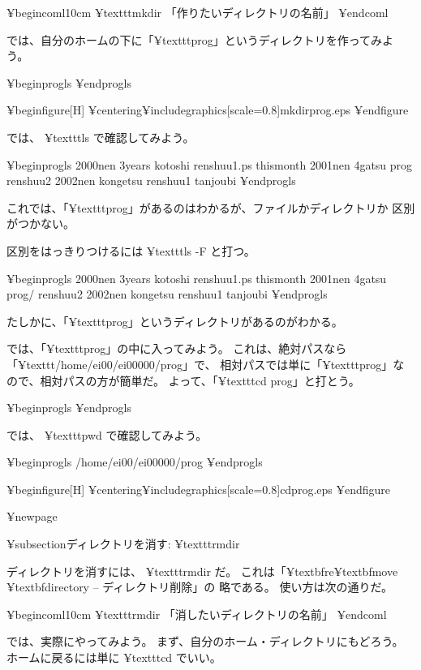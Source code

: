 {¥begin{coml}{10cm}
¥texttt{mkdir} 「作りたいディレクトリの名前」
¥end{coml}

では、自分のホームの下に「¥texttt{prog}」というディレクトリを作ってみよう。

¥begin{progls}
%
¥end{progls}

¥begin{figure}[H]
¥centering{¥includegraphics[scale=0.8]{mkdirprog.eps}}
¥end{figure}

では、 ¥texttt{ls} で確認してみよう。

¥begin{progls}
2000nen         3years          kotoshi         renshuu1.ps     thismonth
2001nen         4gatsu          prog            renshuu2
2002nen         kongetsu        renshuu1        tanjoubi
%
¥end{progls}

これでは、「¥texttt{prog}」があるのはわかるが、ファイルかディレクトリか
区別がつかない。

区別をはっきりつけるには ¥texttt{ls -F} と打つ。

¥begin{progls}
2000nen         3years          kotoshi         renshuu1.ps     thismonth
2001nen         4gatsu          prog/           renshuu2
2002nen         kongetsu        renshuu1        tanjoubi
%
¥end{progls}

たしかに、「¥texttt{prog}」というディレクトリがあるのがわかる。

では、「¥texttt{prog}」の中に入ってみよう。
これは、絶対パスなら「¥texttt{/home/ei00/ei00000/prog}」で、
相対パスでは単に「¥texttt{prog}」なので、相対パスの方が簡単だ。
よって、「¥texttt{cd prog}」と打とう。

¥begin{progls}
%
¥end{progls}

では、 ¥texttt{pwd} で確認してみよう。

¥begin{progls}
/home/ei00/ei00000/prog
%
¥end{progls}

¥begin{figure}[H]
¥centering{¥includegraphics[scale=0.8]{cdprog.eps}}
¥end{figure}

¥newpage

¥subsection{ディレクトリを消す: ¥texttt{rmdir}}

ディレクトリを消すには、 ¥texttt{rmdir} だ。
これは「¥textbf{r}e¥textbf{m}ove ¥textbf{dir}ectory -- ディレクトリ削除」の
略である。
使い方は次の通りだ。

¥begin{coml}{10cm}
¥texttt{rmdir} 「消したいディレクトリの名前」
¥end{coml}

では、実際にやってみよう。
まず、自分のホーム・ディレクトリにもどろう。
ホームに戻るには単に ¥texttt{cd} でいい。

}
